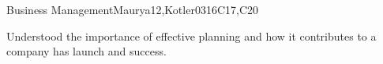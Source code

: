 \begin{syllabus}
\begin{unit}{Business Management}{}{Maurya12,Kotler03}{16}{C17,C20}
\begin{learningoutcomes}
   \item Understood the importance of effective planning and how it contributes to a company has launch and success.
\end{learningoutcomes}
\end{unit}

\begin{coursebibliography}
\end{coursebibliography}

\end{syllabus}
